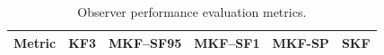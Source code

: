 \begin{table}[ht]
	\begin{center}
		\caption{Observer performance evaluation metrics.} \label{tb:grind1-RMSE-results}
		\begin{tabular}{p{}>{\centering\arraybackslash}p{}>{\centering\arraybackslash}p{}>{\centering\arraybackslash}p{}>{\centering\arraybackslash}p{}>{\centering\arraybackslash}p{}}
			Metric & KF3 & MKF--SF95 & MKF--SF1 & MKF-SP & SKF \\
			\hline

\end{tabular}
\end{center}
\end{table}
